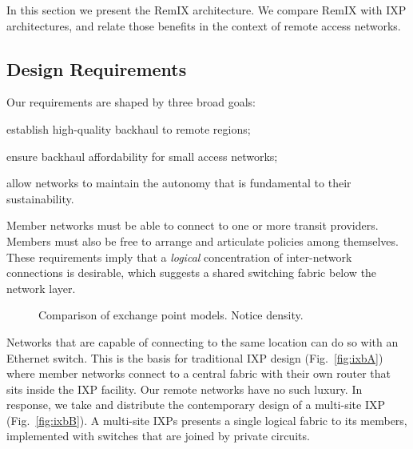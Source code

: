 In this section we present the RemIX architecture. We compare RemIX with IXP architectures, and relate those
benefits in the context of remote access networks.

\subsection{Design Requirements}

Our requirements are shaped by three broad goals:
\begin{inparaenum}[(i)]
  \item establish high-quality backhaul to remote regions;
  \item ensure backhaul affordability for small access networks;
  \item allow networks to maintain the autonomy that is
    fundamental to their sustainability.
\end{inparaenum}
Member networks must be able to connect to one or more transit providers.
Members must also be free to arrange and articulate policies among themselves.
These requirements imply that a \emph{logical} concentration of inter-network
connections is desirable, which suggests a shared switching fabric below the
network layer.

\begin{figure*}
   \hfill
   \hfill
  \subfloat[RemIX]{
    \resizebox{0.45\columnwidth}{!}{
      \begin{tikzpicture}
        \ixboxesC
      \end{tikzpicture}
      \label{fig:ixbC}
    }
  }
  \caption{Comparison of exchange point models. Notice density.}
  \label{fig:ixb}
\end{figure*}

Networks that are capable of connecting to the same location can do so with an
Ethernet switch. This is the basis for traditional \ac{IXP} design (Fig.~\ref{fig:ixbA}) where member networks connect to a central fabric
with their own router that sits inside the IXP facility. Our remote networks
have no such luxury. In response, we take and distribute the contemporary design
of a multi-site \ac{IXP} (Fig.~\ref{fig:ixbB}). A multi-site \acp{IXP}
presents a single logical fabric to its members, implemented with switches
that are joined by private circuits.

